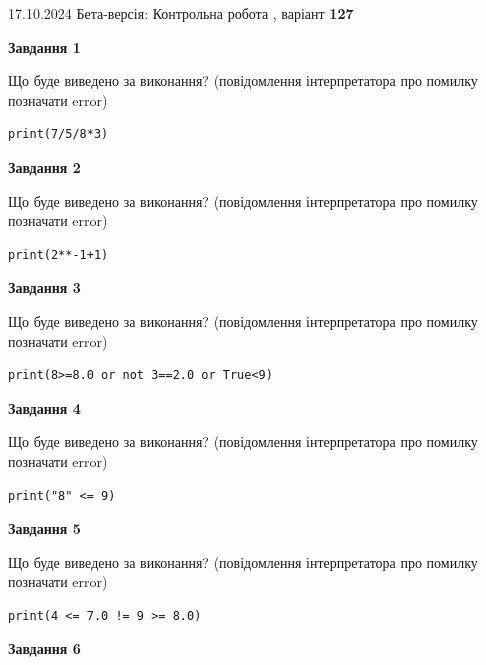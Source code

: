\documentclass[12pt, ukrainian]{article}
\begin{document}
{\Large{17.10.2024 Бета-версія: Контрольна робота , варіант  \No \textbf { 127 }\par}}
{
\begin {large}
{\begin {center}\textbf{Завдання 1}\end {center}}

Що буде виведено за виконання? (повідомлення інтерпретатора про помилку позначати error)\par
\begin{verbatim}
print(7/5/8*3)
\end{verbatim}

{\begin {center}\textbf{Завдання 2}\end {center}}

Що буде виведено за виконання? (повідомлення інтерпретатора про помилку позначати error)\par
\begin{verbatim}
print(2**-1+1)
\end{verbatim}

{\begin {center}\textbf{Завдання 3}\end {center}}

Що буде виведено за виконання? (повідомлення інтерпретатора про помилку позначати error)\par
\begin{verbatim}
print(8>=8.0 or not 3==2.0 or True<9)
\end{verbatim}

{\begin {center}\textbf{Завдання 4}\end {center}}

Що буде виведено за виконання? (повідомлення інтерпретатора про помилку позначати error)\par
\begin{verbatim}
print("8" <= 9)
\end{verbatim}

{\begin {center}\textbf{Завдання 5}\end {center}}

Що буде виведено за виконання? (повідомлення інтерпретатора про помилку позначати error)\par
\begin{verbatim}
print(4 <= 7.0 != 9 >= 8.0)
\end{verbatim}

{\begin {center}\textbf{Завдання 6}\end {center}}


\end{large}}
\end{document}
